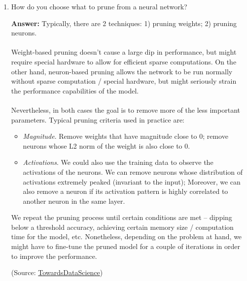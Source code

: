 \documentclass{article}
\newenvironment{QandA}{\begin{enumerate}[label=\arabic*.]}{\end{enumerate}}
\newenvironment{InnerQandA}{\begin{enumerate}[label=\roman*.]}{\end{enumerate}}
\newenvironment{answer}{\par\normalfont \textbf{Answer:}}{}
\begin{document}
\begin{QandA}
\begin{InnerQandA}
        \item How do you choose what to prune from a neural network?
        \begin{answer}
            Typically, there are 2 techniques: 1) pruning weights; 2) pruning neurons. \\\\
            Weight-based pruning doesn't cause a large dip in performance, but might require special hardware to allow for efficient sparse computations.  On the other hand, neuron-based pruning allows the network to be run normally without sparse computation / special hardware, but might seriously strain the performance capabilities of the model. \\\\
            Nevertheless, in both cases the goal is to remove more of the less important parameters. Typical pruning criteria used in practice are:
            \begin{itemize}
                \item \textit{Magnitude}. Remove weights that have magnitude close to 0; remove neurons whose L2 norm of the weight is also close to 0.
                \item \textit{Activations}. We could also use the training data to observe the activations of the neurons. We can remove neurons whose distribution of  activations extremely peaked (invariant to the input); Moreover, we can also remove a neuron if its activation pattern is highly correlated to another neuron in the same layer. 
            \end{itemize}

            We repeat the pruning process until certain conditions are met -- dipping below a threshold accuracy, achieving certain memory size / computation time for the model, etc. Nonetheless, depending on the problem at hand, we might have to fine-tune the pruned model for a couple of iterations in order to improve the performance. 
            
            (Source: \href{https://towardsdatascience.com/pruning-neural-networks-1bb3ab5791f9}{TowardsDataScience})
        \end{answer}
    \end{InnerQandA}


\end{QandA}
\end{document}
